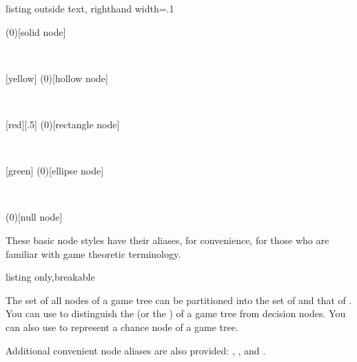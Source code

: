 \begin{tcblisting}{listing outside text, righthand width=.1\linewidth}
\begin{istgame}\setistSolidNodeStyle[blue]{10pt}
    \istroot(0)[solid node]\endist\end{istgame}\\[1ex]
\begin{istgame}\setistHollowNodeStyle[blue]{10pt}[yellow]
    \istroot(0)[hollow node]\endist\end{istgame}\\[1ex]
\begin{istgame}\setistRectangleNodeStyle{10pt}[red][.5]
    \istroot(0)[rectangle node]\endist\end{istgame}\\[1ex]
\begin{istgame}\setistEllipseNodeStyle[blue]{10pt}[green]
    \istroot(0)[ellipse node]\endist\end{istgame}\\[1ex]
\begin{istgame}\setistNullNodeStyle[blue!20]{10pt}
    \istroot(0)[null node]\endist\end{istgame}
\end{tcblisting}


These basic node styles have their aliases, for convenience, for those who are familiar with game theoretic terminology.

\begin{tcblisting}{listing only,breakable}
\tikzset{decision node/.style=solid node}  %
\tikzset{terminal node/.style=solid node}  %
\tikzset{initial node/.style=hollow node}
\tikzset{chance node/.style=hollow node}
\end{tcblisting}

The set of all nodes of a game tree can be partitioned into
the set of  and that of .
You can use 
to distinguish the  (or the ) of a game tree from decision nodes.
You can also use  to represent a chance node of a game tree.


Additional convenient node aliases are also provided: , , and .

